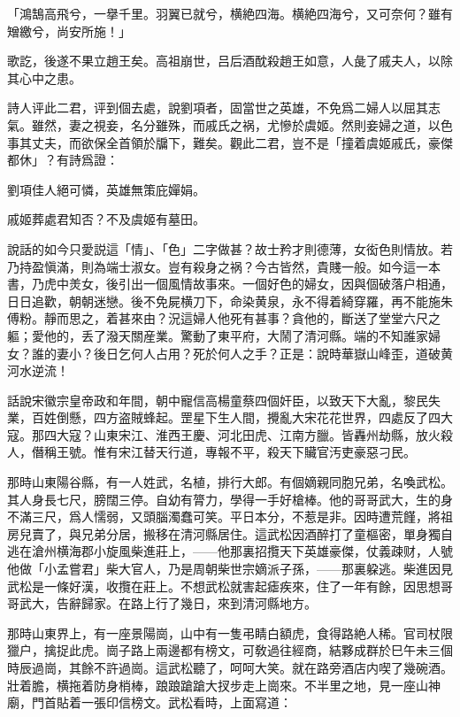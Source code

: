 \begin{myquote}
「鴻鵠高飛兮，一擧千里。羽翼已就兮，横絶四海。横絶四海兮，又可奈何？雖有矰繳兮，尚安所施！」
\end{myquote}

歌訖，後遂不果立趙王矣。高祖崩世，吕后酒酖殺趙王如意，人彘了戚夫人，以除其心中之患。

詩人评此二君，评到個去處，說劉項者，固當世之英雄，不免爲二婦人以屈其志氣。雖然，妻之視妾，名分雖殊，而戚氏之祸，尤慘於虞姬。然則妾婦之道，以色事其丈夫，而欲保全首領於牖下，難矣。觀此二君，豈不是「撞着虞姬戚氏，豪傑都休」？有詩爲證：

\begin{myquote}
劉項佳人絕可憐，英雄無策庇嬋娟。

戚姬葬處君知否？不及虞姬有墓田。
\end{myquote}

說話的如今只愛説這「情」、「色」二字做甚？故士矜才則德薄，女衒色則情放。若乃持盈愼滿，則為端士淑女。豈有殺身之祸？今古皆然，貴賤一般。如今這一本書，乃虎中羙女，後引出一個風情故事來。一個好色的婦女，因與個破落户相通，日日追歡，朝朝迷戀。後不免屍横刀下，命染黄泉，永不得着綺穿羅，再不能施朱傅粉。靜而思之，着甚來由？況這婦人他死有甚事？貪他的，斷送了堂堂六尺之軀；愛他的，丢了潑天關産業。驚動了東平府，大鬧了清河縣。端的不知誰家婦女？誰的妻小？後日乞何人占用？死於何人之手？正是：說時華嶽山峰歪，道破黄河水逆流！

話說宋徽宗皇帝政和年間，朝中寵信高楊童蔡四個奸臣，以致天下大亂，黎民失業，百姓倒懸，四方盗賊蜂起。罡星下生人間，攪亂大宋花花世界，四處反了四大寇。那四大寇？山東宋江、淮西王慶、河北田虎、江南方臘。皆轟州劫縣，放火殺人，僭稱王號。惟有宋江替天行道，專報不平，殺天下贜官汚吏豪惡刁民。

那時山東陽谷縣，有一人姓武，名植，排行大郎。有個嫡親同胞兄弟，名喚武松。其人身長七尺，膀闊三停。自幼有膂力，學得一手好槍棒。他的哥哥武大，生的身不滿三尺，爲人懦弱，又頭腦濁蠢可笑。平日本分，不惹是非。因時遭荒饉，將祖房兒賣了，與兄弟分居，搬移在清河縣居住。這武松因酒醉打了童樞密，單身獨自逃在滄州横海郡小旋風柴進莊上，——他那裏招攬天下英雄豪傑，仗義疎财，人號他做「小孟嘗君」柴大官人，乃是周朝柴世宗嫡派子孫，——那裏躱逃。柴進因見武松是一條好漢，收攬在莊上。不想武松就害起瘧疾來，住了一年有餘，因思想哥哥武大，告辭歸家。在路上行了幾日，來到清河縣地方。

那時山東界上，有一座景陽崗，山中有一隻弔睛白額虎，食得路絶人稀。官司杖限獵户，擒捉此虎。崗子路上兩邊都有榜文，可敎過往經商，結夥成群於巳午未三個時辰過崗，其餘不許過崗。這武松聽了，呵呵大笑。就在路旁酒店内喫了幾碗酒。壯着膽，横拖着防身梢棒，踉踉蹌蹌大扠步走上崗來。不半里之地，見一座山神廟，門首貼着一張印信榜文。武松看時，上面寫道：

